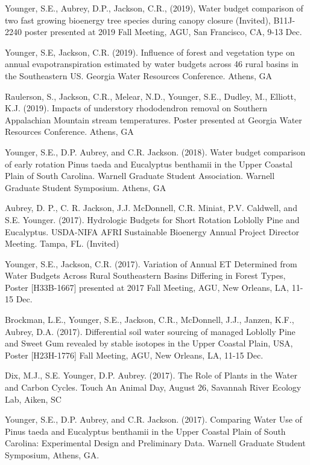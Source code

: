 \documentclass[10pt,letterpaper]{article}
\begin{document}
\begin{hangparas}{.25in}{1}
	
	Younger, S.E., Aubrey, D.P., Jackson, C.R., (2019), Water budget comparison of two fast growing bioenergy tree species during canopy closure (Invited), B11J-2240 poster presented at 2019 Fall Meeting, AGU, San Francisco, CA, 9-13 Dec.
	
	Younger, S.E, Jackson, C.R. (2019). Influence of forest and vegetation type on annual evapotranspiration estimated by water budgets across 46 rural basins in the Southeastern US. Georgia Water Resources Conference. Athens, GA
	
	Raulerson, S., Jackson, C.R., Melear, N.D., Younger, S.E., Dudley, M., Elliott, K.J. (2019). Impacts of understory rhododendron removal on Southern Appalachian Mountain stream temperatures. Poster presented at Georgia Water Resources Conference. Athens, GA
	
	Younger, S.E., D.P. Aubrey, and C.R. Jackson. (2018). Water budget comparison of early rotation Pinus taeda and Eucalyptus benthamii in the Upper Coastal Plain of South Carolina. Warnell Graduate Student Association. Warnell Graduate Student Symposium. Athens, GA
	
	Aubrey, D. P., C. R. Jackson, J.J. McDonnell, C.R. Miniat, P.V. Caldwell, and S.E. Younger. (2017). Hydrologic Budgets for Short Rotation Loblolly Pine and Eucalyptus. USDA-NIFA AFRI Sustainable Bioenergy Annual Project Director Meeting. Tampa, FL. (Invited)
	
	Younger, S.E., Jackson, C.R. (2017). Variation of Annual ET Determined from Water Budgets Across Rural Southeastern Basins Differing in Forest Types, Poster [H33B-1667] presented at 2017 Fall Meeting, AGU, New Orleans, LA, 11-15 Dec.
	
	Brockman, L.E., Younger, S.E., Jackson, C.R., McDonnell, J.J., Janzen, K.F., Aubrey, D.A. (2017). Differential soil water sourcing of managed Loblolly Pine and Sweet Gum revealed by stable isotopes in the Upper Coastal Plain, USA, Poster [H23H-1776] Fall Meeting, AGU, New Orleans, LA, 11-15 Dec.
	
	Dix, M.J., S.E. Younger, D.P. Aubrey. (2017). The Role of Plants in the Water and Carbon Cycles. Touch An Animal Day, August 26, Savannah River Ecology Lab, Aiken, SC
	
	Younger, S.E., D.P. Aubrey, and C.R. Jackson. (2017). Comparing Water Use of Pinus taeda and Eucalyptus benthamii in the Upper Coastal Plain of South Carolina: Experimental Design and Preliminary Data. Warnell Graduate Student Symposium, Athens, GA. 
	

\end{hangparas}
\end{document}
